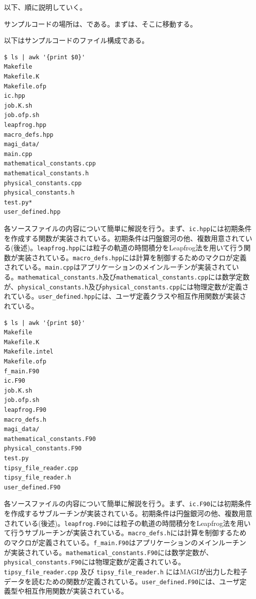 以下、順に説明していく。

\label{s3sec:NbosySPH_code_loc}
サンプルコードの場所は、\dirNameNbodySPHSample である。まずは、そこに移動する。

\label{s3sec:NbodySPH_file_str}
以下はサンプルコードのファイル構成である。
\ifCpp %
\begin{screen}
\begin{verbatim}
$ ls | awk '{print $0}'
Makefile
Makefile.K
Makefile.ofp
ic.hpp
job.K.sh
job.ofp.sh
leapfrog.hpp
macro_defs.hpp
magi_data/
main.cpp
mathematical_constants.cpp
mathematical_constants.h
physical_constants.cpp
physical_constants.h
test.py*
user_defined.hpp
\end{verbatim}
\end{screen}
各ソースファイルの内容について簡単に解説を行う。まず、\texttt{ic.hpp}には初期条件を作成する関数が実装されている。初期条件は円盤銀河の他、複数用意されている(後述)。\texttt{leapfrog.hpp}には粒子の軌道の時間積分をLeapfrog法を用いて行う関数が実装されている。\texttt{macro\_defs.hpp}には計算を制御するためのマクロが定義されている。\texttt{main.cpp}はアプリケーションのメインルーチンが実装されている。\texttt{mathematical\_constants.h}及び\texttt{mathematical\_constants.cpp}には数学定数が、\texttt{physical\_constants.h}及び\texttt{physical\_constants.cpp}には物理定数が定義されている。\texttt{user\_defined.hpp}には、ユーザ定義クラスや相互作用関数が実装されている。
\endifCpp
\ifFtn %
\begin{screen}
\begin{verbatim}
$ ls | awk '{print $0}'
Makefile
Makefile.K
Makefile.intel
Makefile.ofp
f_main.F90
ic.F90
job.K.sh
job.ofp.sh
leapfrog.F90
macro_defs.h
magi_data/
mathematical_constants.F90
physical_constants.F90
test.py
tipsy_file_reader.cpp
tipsy_file_reader.h
user_defined.F90
\end{verbatim}
\end{screen}
各ソースファイルの内容について簡単に解説を行う。まず、\texttt{ic.F90}には初期条件を作成するサブルーチンが実装されている。初期条件は円盤銀河の他、複数用意されている(後述)。\texttt{leapfrog.F90}には粒子の軌道の時間積分をLeapfrog法を用いて行うサブルーチンが実装されている。\texttt{macro\_defs.h}には計算を制御するためのマクロが定義されている。\texttt{f\_main.F90}はアプリケーションのメインルーチンが実装されている。\texttt{mathematical\_constants.F90}には数学定数が、\texttt{physical\_constants.F90}には物理定数が定義されている。\texttt{tipsy\_file\_reader.cpp} 及び \texttt{tipsy\_file\_reader.h} には\textsc{MAGI}が出力した粒子データを読むための関数が定義されている。\texttt{user\_defined.F90}には、ユーザ定義型や相互作用関数が実装されている。
